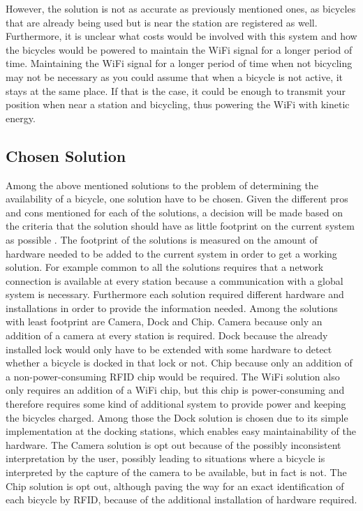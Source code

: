 However, the solution is not as accurate as previously mentioned ones, as bicycles that are already being used but is near the station are registered as well.
Furthermore, it is unclear what costs would be involved with this system and how the bicycles would be powered to maintain the WiFi signal for a longer period of time. 
Maintaining the WiFi signal for a longer period of time when not bicycling may not be necessary as you could assume that when a bicycle is not active, it stays at the same place.
If that is the case, it could be enough to transmit your position when near a station and bicycling, thus powering the WiFi with kinetic energy.

\subsection{Chosen Solution}
Among the above mentioned solutions to the problem of determining the availability of a bicycle, one solution have to be chosen. 
Given the different pros and cons mentioned for each of the solutions, a decision will be made based on the criteria that the solution should have as little footprint on the current system as possible . 
The footprint of the solutions is measured on the amount of hardware needed to be added to the current system in order to get a working solution. 
For example common to all the solutions requires that a network connection is available at every station because a communication with a global system is necessary. 
Furthermore each solution required different hardware and installations in order to provide the information needed. 
Among the solutions with least footprint are Camera, Dock and Chip. 
Camera because only an addition of a camera at every station is required. 
Dock because the already installed lock would only have to be extended with some hardware to detect whether a bicycle is docked in that lock or not.
Chip because only an addition of a non-power-consuming RFID chip would be required.
The WiFi solution also only requires an addition of a WiFi chip, but this chip is power-consuming and therefore requires some kind of additional system to provide power and keeping the bicycles charged.
Among those the Dock solution is chosen due to its simple implementation at the docking stations, which enables easy maintainability of the hardware. The Camera solution is opt out because of the possibly inconsistent interpretation by the user, possibly leading to situations where a bicycle is interpreted by the capture of the camera to be available, but in fact is not. The Chip solution is opt out, although paving the way for an exact identification of each bicycle by RFID, because of the additional installation of hardware required.

